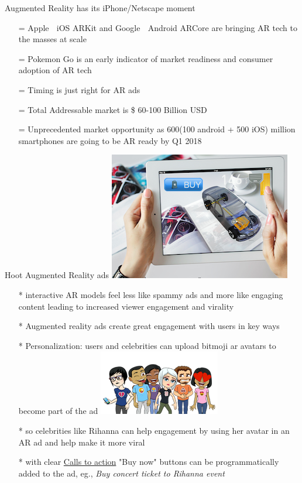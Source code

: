 \documentclass[12pt]{beamer}
\begin{document}
\begin{frame}[t]{Augmented Reality has its iPhone/Netscape moment}
  \begin{itemize}[<+-| alert@+>]
	\item[=]Apple 🍎
	 iOS ARKit and Google 🤖 Android ARCore are bringing AR tech to the masses at scale
	\item[=]Pokemon Go is an early indicator of market readiness and consumer adoption of AR tech
	\item[=]Timing is just right for AR ads
	\item[=]Total Addressable market is \$ 60-100 Billion USD 
	\item[=]Unprecedented market opportunity as 600(100 android + 500 iOS) million smartphones are going to be AR ready by Q1 2018
\end{itemize}
\end{frame}
\begin{frame}[t]{Hoot Augmented Reality ads \includegraphics[scale=.1]{static/arad/arad5}} 
  \begin{itemize}[<+-| alert@+>]
\item[*]interactive AR models feel  less like spammy ads and more like engaging content leading to increased viewer engagement and virality 
\item[*]Augmented reality ads create great engagement with users in key ways
\item[*]Personalization: users and celebrities can upload bitmoji ar avatars to become part of the ad
\includegraphics[scale=.15]{static/arad/bitmoji} 
\item[*]so celebrities like Rihanna can help engagement by using her avatar in an AR ad and help make it more viral 
\item[*]with clear \underline{Calls to action} "Buy now" buttons can be programmatically added to the ad, eg., \emph{ Buy concert ticket to Rihanna event}
\end{itemize}
\end{frame}
\end{document}
